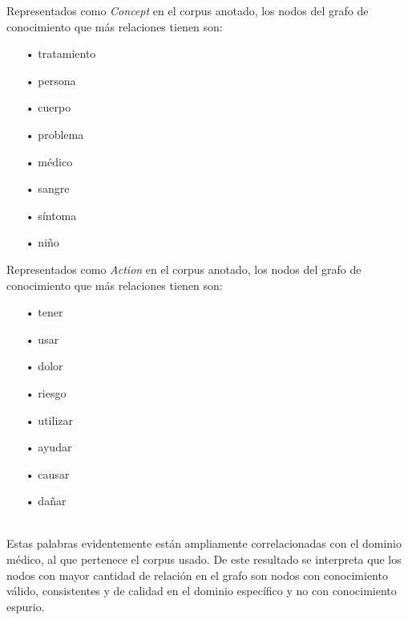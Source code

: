 \vspace{0.1in}
\noindent\begin{minipage}[h]{0.47\textwidth}
	Representados como \textit{Concept} en el corpus anotado, los nodos del grafo de conocimiento que más relaciones tienen son:\\
	\vspace{-0.3in}
	\begin{itemize}
		\item[•] tratamiento
		\vspace{-0.1in}
		\item[•] persona
		\vspace{-0.1in}
		\item[•] cuerpo
		\vspace{-0.1in}
		\item[•] problema
		\vspace{-0.1in}
		\item[•] médico
		\vspace{-0.1in}
		\item[•] sangre
		\vspace{-0.1in}
		\item[•] síntoma
		\vspace{-0.1in}
		\item[•] niño
	\end{itemize}
\end{minipage}
\hspace{0.04\textwidth}
\begin{minipage}[h]{0.47\textwidth}
	Representados como \textit{Action} en el corpus anotado, los nodos del grafo de conocimiento que más relaciones tienen son:\\
	\vspace{-0.3in}
	\begin{itemize}
		\item[•] tener
		\vspace{-0.1in}
		\item[•] usar
		\vspace{-0.1in}
		\item[•] dolor
		\vspace{-0.1in}
		\item[•] riesgo
		\vspace{-0.1in}
		\item[•] utilizar
		\vspace{-0.1in}
		\item[•] ayudar
		\vspace{-0.1in}
		\item[•] causar
		\vspace{-0.1in}
		\item[•] dañar
	\end{itemize}
\end{minipage}\\

Estas palabras evidentemente están ampliamente correlacionadas con el dominio médico, al que pertenece el corpus usado. De este resultado se interpreta que los nodos con mayor cantidad de relación en el grafo son nodos con conocimiento válido, consistentes y de calidad en el dominio específico y no con conocimiento espurio.